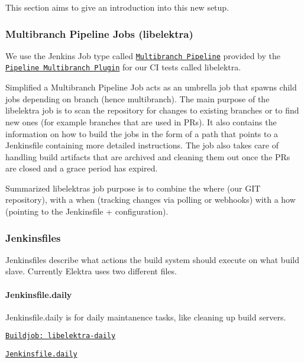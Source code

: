 This section aims to give an introduction into this new setup.

\subsubsection*{Multibranch Pipeline Jobs (libelektra)}

We use the Jenkins Job type called \href{https://jenkins.io/doc/book/pipeline/multibranch/#creating-a-multibranch-pipeline}{\tt Multibranch Pipeline} provided by the \href{https://wiki.jenkins.io/display/JENKINS/Pipeline+Multibranch+Plugin}{\tt Pipeline Multibranch Plugin} for our CI tests called {\ttfamily libelektra}.

Simplified a Multibranch Pipeline Job acts as an umbrella job that spawns child jobs depending on branch (hence multibranch). The main purpose of the libelektra job is to scan the repository for changes to existing branches or to find new ones (for example branches that are used in PR\textquotesingle{}s). It also contains the information on how to build the jobs in the form of a path that points to a Jenkinsfile containing more detailed instructions. The job also takes care of handling build artifacts that are archived and cleaning them out once the PR\textquotesingle{}s are closed and a grace period has expired.

Summarized libelektra\textquotesingle{}s job purpose is to combine the where (our G\+IT repository), with a when (tracking changes via polling or webhooks) with a how (pointing to the Jenkinsfile + configuration).

\subsubsection*{Jenkinsfiles}

Jenkinsfiles describe what actions the build system should execute on what build slave. Currently Elektra uses two different files.

\paragraph*{Jenkinsfile.\+daily}


\begin{DoxyItemize}
\item Jenkinsfile.\+daily is for daily maintanence tasks, like cleaning up build servers.
\item \href{https://build.libelektra.org/jenkins/job/libelektra-daily/}{\tt Buildjob\+: libelektra-\/daily}
\item \href{https://master.libelektra.org/scripts/jenkins/Jenkinsfile.daily}{\tt Jenkinsfile.\+daily}
\end{DoxyItemize}

